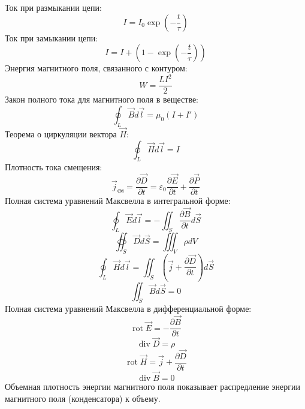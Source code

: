 \documentclass[twoside, a4paperpt, fleqn]{extarticle}
\begin{document}
Ток при размыкании цепи:
\begin{equation*}
    I = I_0 \exp(- \frac{t}{\tau})
\end{equation*}
Ток при замыкании цепи:
\begin{equation*}
    I = I + (1 - \exp(- \frac{t}{\tau}))
\end{equation*}
Энергия магнитного поля, связанного с контуром:
\begin{equation*}
    W = \frac{L I^2}{2}
\end{equation*}
Закон полного тока для магнитного поля в веществе:
\begin{equation*}
    \oint_L \vec{B} d \vec{l} = \mu_0 (I + I')
\end{equation*}
Теорема о циркуляции вектора $\vec{H}$:
\begin{equation*}
    \oint_L \vec{H} d \vec{l} = I
\end{equation*}
Плотность тока смещения:
\begin{equation*}
    \vec{j}_{\text{см}} = \frac{\partial \vec{D}}{\partial t} = \varepsilon_0 \frac{\partial \vec{E}}{\partial t} + \frac{\partial \vec{P}}{\partial t}
\end{equation*}
Полная система уравнений Максвелла в интегральной форме:
\begin{equation*}
    \oint_L \vec{E} d \vec{l} = - \iint_S \frac{\partial \vec{B}}{\partial t} d \vec{S}
\end{equation*}
\begin{equation*}
    \oiint_S \vec{D} d \vec{S} = \iiint_V \rho d V
\end{equation*}
\begin{equation*}
    \oint_L \vec{H} d \vec{l} = \iint_S \left( \vec{j} + \frac{\partial \vec{D}}{\partial t} \right) d \vec{S}
\end{equation*}
\begin{equation*}
    \iint_S \vec{B} d \vec{S} = 0
\end{equation*}
Полная система уравнений Максвелла в дифференциальной форме:
\begin{equation*}
    \operatorname { rot } \vec{E} = -\frac{\partial \vec{B}}{\partial t}
\end{equation*}
\begin{equation*}
    \operatorname { div } \vec{D} = \rho
\end{equation*}
\begin{equation*}
    \operatorname{ rot } \vec{H} = \vec{j} + \frac{\partial \vec{D}}{\partial t}
\end{equation*}
\begin{equation*}
    \operatorname { div } \vec{B} = 0
\end{equation*}
Объемная плотность энергии магнитного поля показывает распредление энергии магнитного  поля (конденсатора) к объему. 
\end{document}
